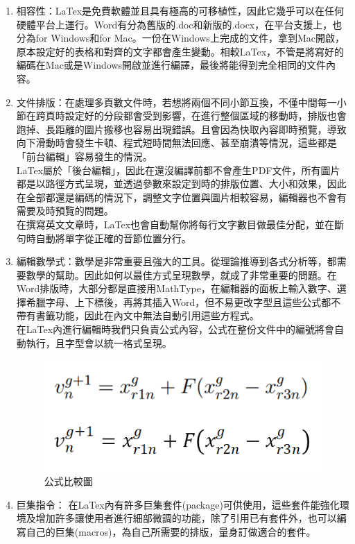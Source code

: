 \documentclass[14pt,a4paper]{report}  %
\begin{document}
{{{		 \begin{enumerate}
		 \item 相容性：LaTex是免費軟體並且具有極高的可移植性，因此它幾乎可以在任何硬體平台上運行。Word有分為舊版的.doc和新版的.docx，在平台支援上，也分為for Windows和for Mac。一份在Windows上完成的文件，拿到Mac開啟，原本設定好的表格和對齊的文字都會產生變動。相較LaTex，不管是將寫好的編碼在Mac或是Windows開啟並進行編譯，最後將能得到完全相同的文件內容。
		 \item 文件排版：在處理多頁數文件時，若想將兩個不同小節互換，不僅中間每一小節在跨頁時設定好的分段都會受到影響，在進行整個區域的移動時，排版也會跑掉、長距離的圖片搬移也容易出現錯誤。且會因為快取內容即時預覽，導致向下滑動時會發生卡頓、程式短時間無法回應、甚至崩潰等情況，這些都是「前台編輯」容易發生的情況。\\
LaTex屬於「後台編輯」，因此在還沒編譯前都不會產生PDF文件，所有圖片都是以路徑方式呈現，並透過參數來設定到時的排版位置、大小和效果，因此在全部都還是編碼的情況下，調整文字位置與圖片相較容易，編輯器也不會有需要及時預覽的問題。\\
在撰寫英文文章時，LaTex也會自動幫你將每行文字數目做最佳分配，並在斷句時自動將單字從正確的音節位置分行。
		\item 編輯數學式：數學是非常重要且強大的工具。從理論推導到各式分析等，都需要數學的幫助。因此如何以最佳方式呈現數學，就成了非常重要的問題。在Word排版時，大部分都是直接用MathType，在編輯器的面板上輸入數字、選擇希臘字母、上下標後，再將其插入Word，但不易更改字型且這些公式都不帶有書籤功能，因此在內文中無法自動引用這些方程式。\\
在LaTex內進行編輯時我們只負責公式內容，公式在整份文件中的編號將會自動執行，且字型會以統一格式呈現。
	
		\begin{figure}[H]
        \centering
        \includegraphics[scale=0.8]{公式比較圖.png} 
        \caption{公式比較圖} 
		\label{fig_公式比較圖:scale}
    	\end{figure}
    	
    	\item 巨集指令：
在LaTex內有許多巨集套件(package)可供使用，這些套件能強化環境及增加許多讓使用者進行細部微調的功能，除了引用已有套件外，也可以編寫自己的巨集(macros)，為自己所需要的排版，量身訂做適合的套件。
		 \end{enumerate}
		 
}}}
\end{document}

